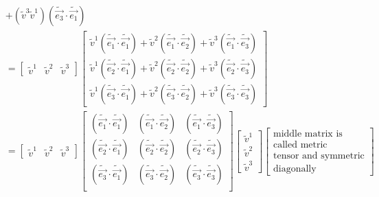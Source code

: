 \documentclass{article}
\begin{document}
\begin{align*}
	  			&+(\widetilde{v}^{3}\widetilde{v}^{1})(\widetilde{\overrightarrow{e_{3}}}\cdot\widetilde{\overrightarrow{e_{1}}})\\
	  			&= \begin{bmatrix}
	  				\widetilde{v}^{1} & \widetilde{v}^{2} & \widetilde{v}^{3}
	  			\end{bmatrix}\begin{bmatrix}
	  			\widetilde{v}^{1}(\widetilde{\overrightarrow{e_{1}}}\cdot\widetilde{\overrightarrow{e_{1}}}) + \widetilde{v}^{2}(\widetilde{\overrightarrow{e_{1}}}\cdot\widetilde{\overrightarrow{e_{2}}}) + \widetilde{v}^{3}(\widetilde{\overrightarrow{e_{1}}}\cdot\widetilde{\overrightarrow{e_{3}}})\\
	  			\widetilde{v}^{1}(\widetilde{\overrightarrow{e_{2}}}\cdot\widetilde{\overrightarrow{e_{1}}}) + \widetilde{v}^{2}(\widetilde{\overrightarrow{e_{2}}}\cdot\widetilde{\overrightarrow{e_{2}}}) + \widetilde{v}^{3}(\widetilde{\overrightarrow{e_{2}}}\cdot\widetilde{\overrightarrow{e_{3}}})\\
	  			\widetilde{v}^{1}(\widetilde{\overrightarrow{e_{3}}}\cdot\widetilde{\overrightarrow{e_{1}}}) + \widetilde{v}^{2}(\widetilde{\overrightarrow{e_{3}}}\cdot\widetilde{\overrightarrow{e_{2}}}) + \widetilde{v}^{3}(\widetilde{\overrightarrow{e_{3}}}\cdot\widetilde{\overrightarrow{e_{3}}})
  			\end{bmatrix}\\
  			  &= \begin{bmatrix}
  			  	\widetilde{v}^{1} & \widetilde{v}^{2} & \widetilde{v}^{3}
  			  \end{bmatrix}\begin{bmatrix}
  			  (\widetilde{\overrightarrow{e_{1}}}\cdot\widetilde{\overrightarrow{e_{1}}}) & (\widetilde{\overrightarrow{e_{1}}}\cdot\widetilde{\overrightarrow{e_{2}}}) & (\widetilde{\overrightarrow{e_{1}}}\cdot\widetilde{\overrightarrow{e_{3}}})\\
  			  (\widetilde{\overrightarrow{e_{2}}}\cdot\widetilde{\overrightarrow{e_{1}}}) & (\widetilde{\overrightarrow{e_{2}}}\cdot\widetilde{\overrightarrow{e_{2}}}) & (\widetilde{\overrightarrow{e_{2}}}\cdot\widetilde{\overrightarrow{e_{3}}})\\
  			  (\widetilde{\overrightarrow{e_{3}}}\cdot\widetilde{\overrightarrow{e_{1}}}) & (\widetilde{\overrightarrow{e_{3}}}\cdot\widetilde{\overrightarrow{e_{2}}}) & (\widetilde{\overrightarrow{e_{3}}}\cdot\widetilde{\overrightarrow{e_{3}}})\\
  		  \end{bmatrix}\begin{bmatrix}
  		  \widetilde{v}^{1}\\
  		  \widetilde{v}^{2}\\
  		  \widetilde{v}^{3}
  	  \end{bmatrix}\begin{bmatrix}
  	  \text{middle matrix is}\\
  	  \text{called metric}\\
  	  \text{tensor and symmetric}\\
  	  \text{diagonally}
    \end{bmatrix}
	\end{align*}
\end{document}
